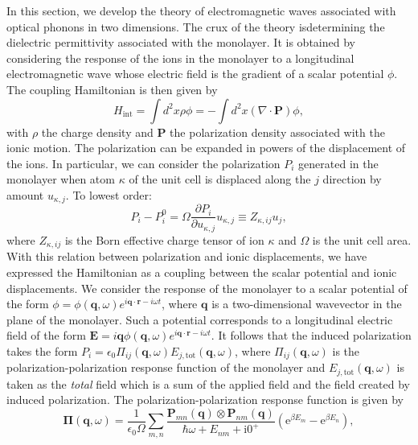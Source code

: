 \documentclass[aps,prb,twocolumn,
	groupedaddress,superscriptaddress,
	amsfonts,amssymb,amsmath,floatfix,
	citeautoscript]{revtex4-1}
\newcommand{\iu}{\mathrm{i}}
\newcommand{\e}{\mathrm{e}}
\begin{document}
In this section, we develop the theory of electromagnetic waves associated with optical phonons in two dimensions. The crux of the theory isdetermining the dielectric permittivity associated with the monolayer. It is obtained by considering the response of the ions in the monolayer to a longitudinal electromagnetic wave whose electric field is the gradient of a scalar potential $\phi$. The coupling Hamiltonian is then given by
\begin{equation}
H_{\mathrm{int}} = \int d^2x \rho \phi = -\int d^2x (\nabla\cdot\mathbf{P})\phi,
\end{equation} 
with $\rho$ the charge density and $\mathbf{P}$ the polarization density associated with the ionic motion. The polarization can be expanded in powers of the displacement of the ions. In particular, we can consider the polarization $P_i$ generated in the monolayer when atom $\kappa$ of the unit cell is displaced along the $j$ direction by amount $u_{\kappa,j}$. To lowest order:
\begin{equation}
P_i - P_i^{0} = \Omega\frac{\partial P_i}{\partial u_{\kappa,j}}u_{\kappa,j} \equiv Z_{\kappa,ij}u_{j},
\end{equation} 
where $Z_{\kappa,ij}$ is the Born effective charge tensor of ion $\kappa$ and $\Omega$ is the unit cell area. With this relation between polarization and ionic displacements, we have expressed the Hamiltonian as a coupling between the scalar potential and ionic displacements. We consider the response of the monolayer to a scalar potential of the form $\phi = \phi(\mathbf{q},\omega)e^{i\mathbf{q}\cdot\mathbf{r}-i\omega t}$, where $\mathbf{q}$ is a two-dimensional wavevector in the plane of the monolayer. Such a potential corresponds to a longitudinal electric field of the form $\mathbf{E} = i\mathbf{q}\phi(\mathbf{q},\omega)e^{i\mathbf{q}\cdot\mathbf{r}-i\omega t}$. It follows that the induced polarization takes the form $P_i  = \epsilon_0\Pi_{ij}(\mathbf{q},\omega)E_{j,\mathrm{tot}}(\mathbf{q},\omega)$, where $\Pi_{ij}(\mathbf{q},\omega)$ is the polarization-polarization response function of the monolayer and  $E_{j,\mathrm{tot}}(\mathbf{q},\omega)$ is taken as the \textit{total} field which is a sum of the applied field and the field created by induced polarization. The polarization-polarization response function is given by
\begin{equation}\label{eq:2dsusceptibility}
\boldsymbol{\Pi}(\mathbf{q},\omega) =  \frac{1}{\epsilon_0 \Omega}\sum\limits_{m,n}\frac{\mathbf{P}_{mn}(\mathbf{q})\otimes\mathbf{P}_{nm}(\mathbf{q})}{\hbar\omega + E_{nm}+\iu 0^+}\left(\e^{\beta E_m}-\e^{\beta E_n} \right),
\end{equation}
\end{document}
